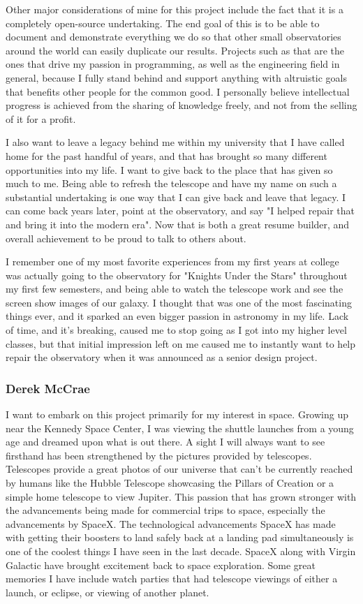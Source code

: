 \documentclass[12pt]{report}
\begin{document}
Other major considerations of mine for this project include the fact that it is a completely open-source undertaking. The end goal of this is to be able to document and demonstrate everything we do so that other small observatories around the world can easily duplicate our results. Projects such as that are the ones that drive my passion in programming, as well as the engineering field in general, because I fully stand behind and support anything with altruistic goals that benefits other people for the common good. I personally believe intellectual progress is achieved from the sharing of knowledge freely, and not from the selling of it for a profit.

I also want to leave a legacy behind me within my university that I have called home for the past handful of years, and that has brought so many different opportunities into my life. I want to give back to the place that has given so much to me. Being able to refresh the telescope and have my name on such a substantial undertaking is one way that I can give back and leave that legacy. I can come back years later, point at the observatory, and say "I helped repair that and bring it into the modern era". Now that is both a great resume builder, and overall achievement to be proud to talk to others about.

I remember one of my most favorite experiences from my first years at college was actually going to the observatory for "Knights Under the Stars" throughout my first few semesters, and being able to watch the telescope work and see the screen show images of our galaxy. I thought that was one of the most fascinating things ever, and it sparked an even bigger passion in astronomy in my life. Lack of time, and it's breaking, caused me to stop going as I got into my higher level classes, but that initial impression left on me caused me to instantly want to help repair the observatory when it was announced as a senior design project.

\subsubsection*{Derek McCrae}

I want to embark on this project primarily for my interest in space. Growing up near the Kennedy Space Center, I was viewing the shuttle launches from a young age and dreamed upon what is out there. A sight I will always want to see firsthand has been strengthened by the pictures provided by telescopes. Telescopes provide a great photos of our universe that can't be currently reached by humans like the Hubble Telescope showcasing the Pillars of Creation or a simple home telescope to view Jupiter. This passion that has grown stronger with the advancements being made for commercial trips to space, especially the advancements by SpaceX. The technological advancements SpaceX has made with getting their boosters to land safely back at a landing pad simultaneously is one of the coolest things I have seen in the last decade. SpaceX along with Virgin Galactic have brought excitement back to space exploration. Some great memories I have include watch parties that had telescope viewings of either a launch, or eclipse, or viewing of another planet.
\end{document}
